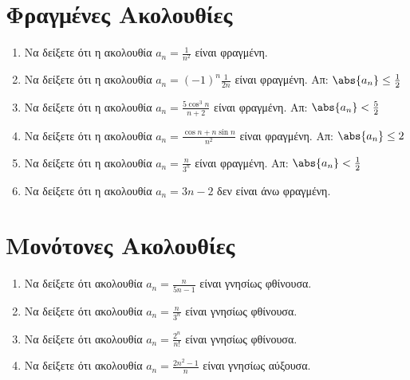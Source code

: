 


\geometry{top=2.5cm}
\everymath{\displaystyle}
\pagestyle{vangelis}



\begin{center}
  \minibox[c]{\large \bfseries \textcolor{Col1}{Ακολουθίες}\\ \large 
  \textcolor{Col1}{Ασκήσεις}}
\end{center}

\vspace{\baselineskip}


\setcounter{chapter}{1}
\section*{Φραγμένες Ακολουθίες}

\begin{enumerate}
  \item Να δείξετε ότι η ακολουθία $ a_{n} = \frac{1}{n^{2}} $ είναι 
    φραγμένη.
  \item Να δείξετε ότι η ακολουθία $ a_{n} = (-1)^{n}\frac{1}{2n} $ είναι 
    φραγμένη.
    \hfill Απ: $ \abs{a_{n}} \leq \frac{1}{2} $ 
  \item Να δείξετε ότι η ακολουθία $ a_{n} = \frac{5 \cos^{3}{n}}{n+2} $ 
    είναι φραγμένη.
    \hfill Απ: $ \abs{a_{n}} < \frac{5}{2}  $ 
  \item Να δείξετε ότι η ακολουθία $ a_{n} = \frac{\cos{n} + n \sin{n}}{n^{2}} $ 
    είναι φραγμένη. 
    \hfill Απ: $ \abs{a_{n}} \leq 2 $ 
  \item Να δείξετε ότι η ακολουθία $ a_{n} = \frac{n}{3^{n}} $ είναι 
    φραγμένη. 
    \hfill Απ: $ \abs{a_{n}}< \frac{1}{2} $
  \item Να δείξετε ότι η ακολουθία $ a_{n} = 3n-2 $ δεν είναι άνω φραγμένη.
\end{enumerate}

\section*{Μονότονες Ακολουθίες}

\begin{enumerate}
  \item Να δείξετε ότι ακολουθία $ a_{n} = \frac{n}{5n-1} $ είναι 
    γνησίως φθίνουσα.
  \item Να δείξετε ότι ακολουθία $ a_{n} = \frac{n}{3^{n}} $ είναι 
    γνησίως φθίνουσα.
  \item Να δείξετε ότι ακολουθία $ a_{n} = \frac{2^{n}}{n!} $ είναι 
    γνησίως φθίνουσα.
  \item Να δείξετε ότι ακολουθία $ a_{n} = \frac{2n^{2}-1}{n} $ είναι γνησίως 
    αύξουσα.
\end{enumerate}



